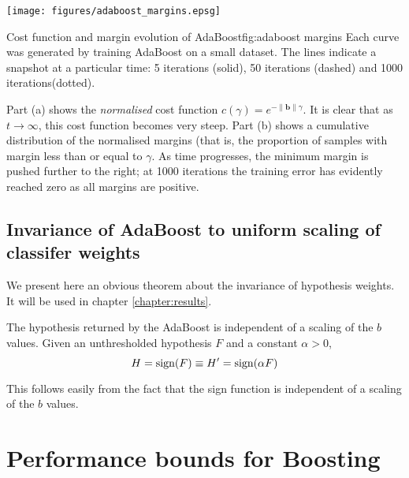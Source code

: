 \begin{linefigure}
\begin{center}
\texttt{[image: figures/adaboost\_margins.epsg]}
\end{center}
\begin{capt}{Cost function and margin evolution of
AdaBoost}{fig:adaboost margins}
Each curve was generated by training AdaBoost on a small dataset.  The
lines indicate a snapshot at a particular time: 5 iterations (solid),
50 iterations (dashed) and 1000 iterations(dotted).

Part (a) shows the \emph{normalised} cost function $c(\gamma) =
e^{-\|\mathbf{b}\| \gamma}$.  It is clear that as $t \rightarrow \infty$,
this cost function becomes very steep.  Part (b) shows a cumulative
distribution of the normalised margins (that is, the proportion of
samples with margin less than or equal to $\gamma$.  As time
progresses, the minimum margin is pushed further to the right; at 1000
iterations the training error has evidently reached zero as all
margins are positive.
\end{capt}
\end{linefigure}




\subsection{Invariance of AdaBoost to uniform scaling of classifer
weights}

We present here an obvious theorem about the invariance of hypothesis
weights.  It will be used in chapter \ref{chapter:results}.

\begin{theorem}
The hypothesis returned by the AdaBoost is independent of a 
scaling of the $b$ values.  Given an unthresholded hypothesis $F$ and
a constant $\alpha > 0$,
%
\begin{equation}
H = \mathrm{sign}(F) \equiv H' = \mathrm{sign}(\alpha F) 
\end{equation}
\end{theorem}

\proof This follows easily from the fact that the sign function is
independent of a scaling of the $b$ values.



\section{Performance bounds for Boosting}

